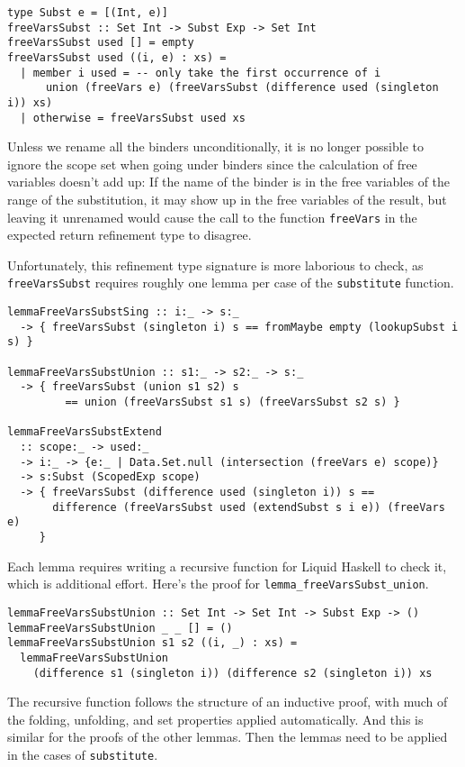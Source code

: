 \documentclass[sigconf, anonymous, review]{acmart}
\newcommand{\tc}[1]{{\small\texttt{#1}}}
\begin{document}
\begin{verbatim}
type Subst e = [(Int, e)]
freeVarsSubst :: Set Int -> Subst Exp -> Set Int
freeVarsSubst used [] = empty
freeVarsSubst used ((i, e) : xs) =
  | member i used = -- only take the first occurrence of i
      union (freeVars e) (freeVarsSubst (difference used (singleton i)) xs)
  | otherwise = freeVarsSubst used xs
\end{verbatim}

Unless we rename all the binders unconditionally, it is no longer
possible to ignore the scope set when going under binders since the calculation
of free variables doesn't add up:
If the name of the binder is in the free variables of the range of the substitution,
it may show up in the free variables of the result, but leaving it unrenamed would
cause the call to the function \tc{freeVars} in the expected return refinement type
to disagree.

Unfortunately, this refinement type signature is more laborious to check, as
\tc{free\-Vars\-Subst} requires roughly one lemma per case of the \tc{subs\-ti\-tute}
function.

\begin{verbatim}
lemmaFreeVarsSubstSing :: i:_ -> s:_
  -> { freeVarsSubst (singleton i) s == fromMaybe empty (lookupSubst i s) }

lemmaFreeVarsSubstUnion :: s1:_ -> s2:_ -> s:_
  -> { freeVarsSubst (union s1 s2) s
         == union (freeVarsSubst s1 s) (freeVarsSubst s2 s) }

lemmaFreeVarsSubstExtend
  :: scope:_ -> used:_
  -> i:_ -> {e:_ | Data.Set.null (intersection (freeVars e) scope)}
  -> s:Subst (ScopedExp scope)
  -> { freeVarsSubst (difference used (singleton i)) s ==
       difference (freeVarsSubst used (extendSubst s i e)) (freeVars e)
     }
\end{verbatim}

Each lemma requires writing a recursive function for Liquid Haskell to
check it, which is additional effort. Here's the proof for
\tc{lemma\_free\-Vars\-Subst\_union}.

\begin{verbatim}
lemmaFreeVarsSubstUnion :: Set Int -> Set Int -> Subst Exp -> ()
lemmaFreeVarsSubstUnion _ _ [] = ()
lemmaFreeVarsSubstUnion s1 s2 ((i, _) : xs) =
  lemmaFreeVarsSubstUnion
    (difference s1 (singleton i)) (difference s2 (singleton i)) xs
\end{verbatim}

The recursive function follows the structure of an inductive proof,
with much of the folding, unfolding, and set properties applied
automatically. And this is similar for the proofs of the other lemmas.
Then the lemmas need to be applied in the cases of \tc{substitute}.
\end{document}
